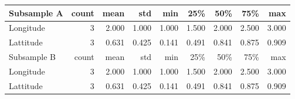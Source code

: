 \begin{tabular}{lrrrrrrrr}
\toprule
Subsample A & count & mean & std & min & 25\% & 50\% & 75\% & max \\
\midrule
Longitude & 3 & 2.000 & 1.000 & 1.000 & 1.500 & 2.000 & 2.500 & 3.000 \\
Lattitude & 3 & 0.631 & 0.425 & 0.141 & 0.491 & 0.841 & 0.875 & 0.909 \\
\midrule
Subsample B & count & mean & std & min & 25\% & 50\% & 75\% & max \\
\midrule
Longitude & 3 & 2.000 & 1.000 & 1.000 & 1.500 & 2.000 & 2.500 & 3.000 \\
Lattitude & 3 & 0.631 & 0.425 & 0.141 & 0.491 & 0.841 & 0.875 & 0.909 \\
\bottomrule
\end{tabular}
